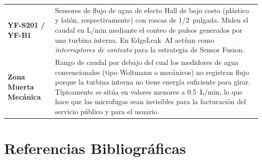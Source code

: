 \documentclass[12pt,a4paper]{article}
\begin{document}
\begin{longtable}{>{\bfseries}p{3.8cm} p{10.5cm}}
YF-S201 / YF-B1 & Sensores de flujo de agua de efecto Hall de bajo costo (plástico y
latón, respectivamente) con roscas de 1/2~pulgada. Miden el caudal en L/min mediante el
conteo de pulsos generados por una turbina interna. En EdgeLeak~AI actúan como
\textit{interruptores de contexto} para la estrategia de Sensor Fusion.
\\[0.5em]

Zona Muerta Mecánica & Rango de caudal por debajo del cual los medidores de agua
convencionales (tipo Woltmann o mecánicos) no registran flujo porque la turbina interna
no tiene energía suficiente para girar. Típicamente se sitúa en valores menores a
0.5~L/min, lo que hace que las microfugas sean invisibles para la facturación del
servicio público y para el usuario.
\\

\end{longtable}

\section*{Referencias Bibliográficas}
\end{document}

